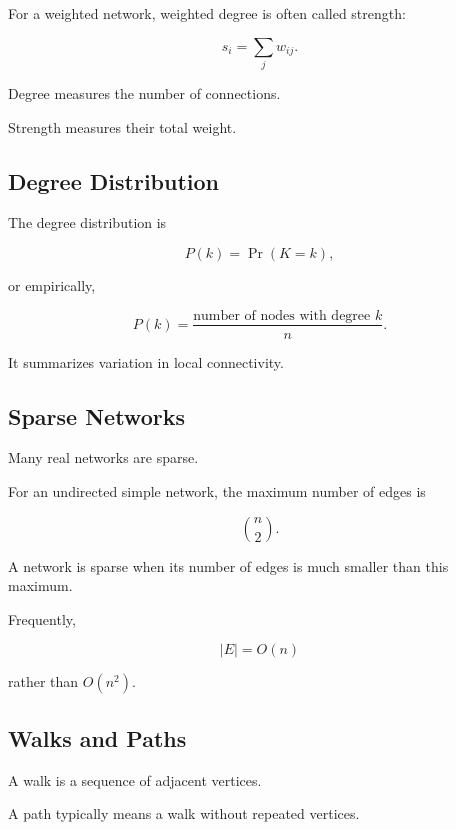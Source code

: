 For a weighted network, weighted degree is often called strength:

\[
\boxed{
s_i
=
\sum_jw_{ij}.
}
\]

Degree measures the number of connections.

Strength measures their total weight.

\subsection{Degree Distribution}
\label{subsec:degree-distribution}

The degree distribution is

\[
\boxed{
P(k)
=
\Pr(K=k),
}
\]

or empirically,

\[
\boxed{
P(k)
=
\frac{
\text{number of nodes with degree }k
}{
n
}.
}
\]

It summarizes variation in local connectivity.

\subsection{Sparse Networks}
\label{subsec:sparse-networks}

Many real networks are sparse.

For an undirected simple network, the maximum number of edges is

\[
\binom{n}{2}.
\]

A network is sparse when its number of edges is much smaller than this
maximum.

Frequently,

\[
\boxed{
|E|=O(n)
}
\]

rather than \(O(n^2)\).

\subsection{Walks and Paths}
\label{subsec:network-walks-paths}

A walk is a sequence of adjacent vertices.

A path typically means a walk without repeated vertices.

